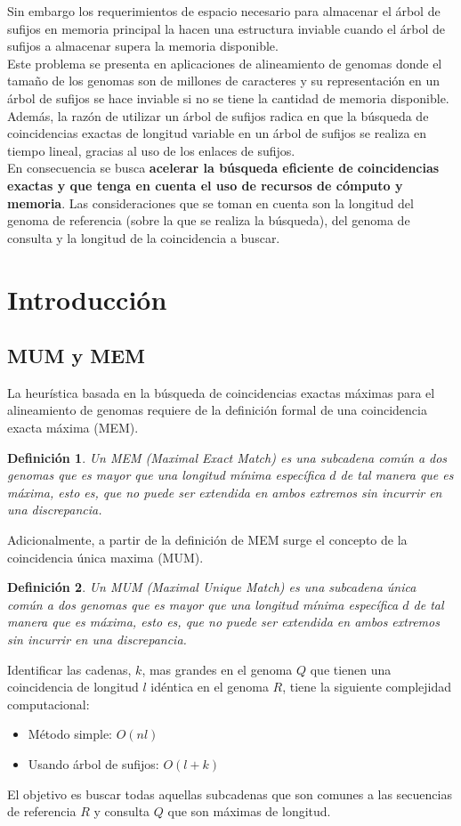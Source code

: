 \documentclass[12pt,a4paper]{article}
\newtheorem{mydef}{Definición}
\begin{document}
\indent
Sin embargo los requerimientos de espacio necesario para almacenar el \'arbol de sufijos en 
memoria principal la hacen una estructura inviable cuando el \'arbol de sufijos a
almacenar supera la memoria disponible.\\
\indent
Este problema se presenta en aplicaciones de alineamiento de genomas donde el
tama\~no de los genomas son de millones de caracteres y su representación en un
árbol de sufijos se hace inviable si no se tiene la cantidad de memoria 
disponible. Además, la razón de utilizar un árbol de sufijos radica en
que la búsqueda de coincidencias exactas de longitud variable en un árbol de 
sufijos se realiza en tiempo lineal, gracias al uso de los enlaces de sufijos.\\
\indent
En consecuencia se busca \textbf{acelerar la búsqueda eficiente de 
coincidencias exactas y que tenga en cuenta el uso de recursos de cómputo y
memoria}. Las consideraciones que se toman en cuenta son la longitud del genoma 
de referencia (sobre la que se realiza la búsqueda), del genoma de consulta y la longitud de la 
coincidencia a buscar.
\section{Introducción} 
\subsection{MUM y MEM} 
\indent
La heurística basada en la búsqueda de coincidencias exactas máximas para el alineamiento de genomas requiere de la definición formal de una coincidencia exacta máxima (MEM).\\
\begin{mydef}
  Un MEM (Maximal Exact Match) es una subcadena común a dos
  genomas que es mayor que una longitud mínima específica $d$ de tal manera
  que es máxima, esto es, que no puede ser extendida en ambos extremos sin
  incurrir en una discrepancia. 
\end{mydef}
\indent
Adicionalmente, a partir de la definición de MEM surge el concepto de la coincidencia única maxima (MUM).\\
\begin{mydef}Un MUM (Maximal Unique Match) es una subcadena única común a dos genomas que es mayor que una longitud mínima específica $d$ de tal manera que es máxima, esto es, que no puede ser extendida en ambos extremos sin incurrir en una discrepancia.
\end{mydef}
Identificar las cadenas, $k$, mas grandes en el genoma $Q$ que tienen una coincidencia de longitud $l$ idéntica en el genoma $R$, tiene la siguiente complejidad computacional:
\begin{itemize}
  \item Método simple: $O(nl)$
  \item Usando árbol de sufijos: $O(l+k)$
\end{itemize}
\indent
El objetivo es buscar todas aquellas subcadenas que son comunes a las secuencias de referencia $R$ y consulta $Q$ que son máximas de longitud.\\
\end{document}
